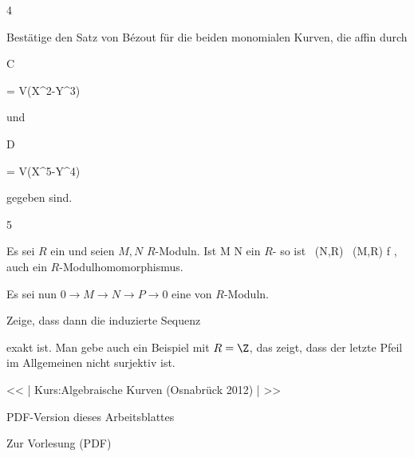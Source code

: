 
{4}

{


Bestätige
den Satz von Bézout
für die beiden monomialen Kurven, die affin durch


\mavergleichskette

{\vergleichskette

{ C
}

{ = }{ V(X^2-Y^3)
}

{  }{
}

{    }{
}

{   }{
}

}
{}{}{}
und


\mavergleichskette

{\vergleichskette

{ D
}

{ = }{ V(X^5-Y^4)
}

{  }{
}

{    }{
}

{   }{
}

}
{}{}{}
gegeben sind.


}

{} {}



{5}

{


Es sei $R$ ein
und seien $M, N$ $R$-Moduln. Ist
 { M } { N
} {}
ein
$R$-
so ist
 {  \, (N,R) } {  \, (M,R)
} {\varphi } {\varphi \circ f
} {,}
auch ein $R$-Modulhomomorphismus.


Es sei nun $0 \to M \to N \to P \to 0$ eine
von $R$-Moduln.


Zeige, dass dann die induzierte Sequenz


 {  }


exakt ist. Man gebe auch ein Beispiel mit $R = \Z$, das zeigt, dass der letzte Pfeil im Allgemeinen nicht surjektiv ist.


}

{} {}


<< | Kurs:Algebraische Kurven (Osnabrück 2012) | >>


PDF-Version dieses Arbeitsblattes


 Zur Vorlesung
(PDF)
